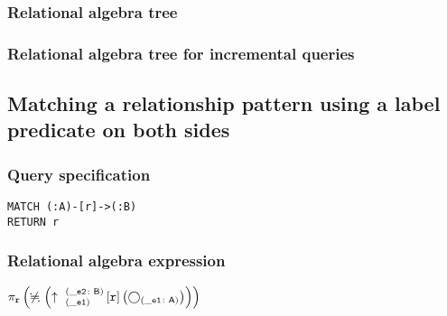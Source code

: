 \subsubsection*{Relational algebra tree}


\subsubsection*{Relational algebra tree for incremental queries}


\subsection{Matching a relationship pattern using a label predicate on both sides}

\subsubsection*{Query specification}

\begin{lstlisting}
MATCH (:A)-[r]->(:B)
RETURN r
\end{lstlisting}

\subsubsection*{Relational algebra expression}

$\projection{\var{r}} \left(\alldifferent{} \left(\expandout{\_e1}{\_e2}{B}{r}{} \left(\getvertices{\_e1}{A}\right)\right)\right)$


